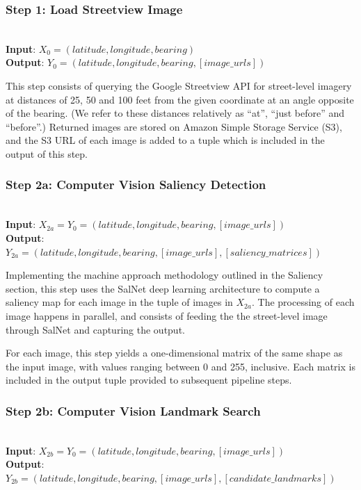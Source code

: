 \subsubsection*{Step 1: Load Streetview Image}~\\
\noindent \textbf{Input}: $X_0 = (latitude, longitude, bearing)$\\
\textbf{Output}: $Y_0 = (latitude, longitude, bearing, [image\_urls])$

This step consists of querying the Google Streetview API for street-level imagery at distances of 25, 50 and 100 feet from the given coordinate at an angle opposite of the bearing. (We refer to these distances relatively as “at”, “just before” and “before”.) Returned images are stored on Amazon Simple Storage Service (S3), and the S3 URL of each image is added to a tuple which is included in the output of this step. 

\subsubsection*{Step 2a: Computer Vision Saliency Detection}~\\
\noindent\textbf{Input}: $X_{2a} = Y_0 = (latitude, longitude, bearing, [image\_urls])$\\
\textbf{Output}: $Y_{2a} = (latitude, longitude, bearing, [image\_urls], [saliency\_matrices])$ 

Implementing the machine approach methodology outlined in the Saliency section, this step uses the SalNet deep learning architecture to compute a saliency map for each image in the tuple of images in $X_{2a}$. The processing of each image happens in parallel, and consists of feeding the the street-level image through SalNet and capturing the output.

For each image, this step yields a one-dimensional matrix of the same shape as the input image, with values ranging between 0 and 255, inclusive. Each matrix is included in the output tuple provided to subsequent pipeline steps.

\subsubsection*{Step 2b: Computer Vision Landmark Search}~\\
\noindent\textbf{Input}: $X_{2b} = Y_0 = (latitude, longitude, bearing, [image\_urls])$\\
\textbf{Output}: $Y_{2b} = (latitude, longitude, bearing,  [image\_urls], [candidate\_landmarks] )$ 

